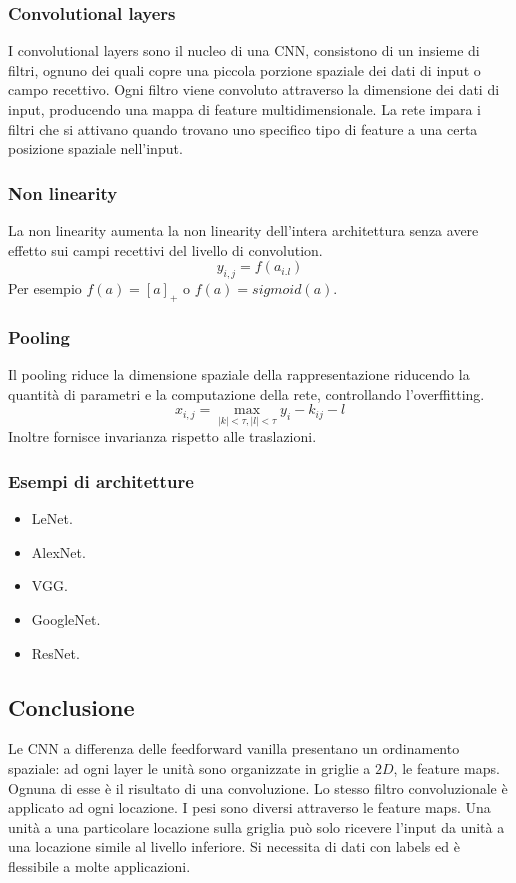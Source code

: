 		\subsubsection{Convolutional layers}
		I convolutional layers sono il nucleo di una CNN, consistono di un insieme di filtri, ognuno dei quali copre una piccola porzione spaziale dei dati di input o campo recettivo.
		Ogni filtro viene convoluto attraverso la dimensione dei dati di input, producendo una mappa di feature multidimensionale.
		La rete impara i filtri che si attivano quando trovano uno specifico tipo di feature a una certa posizione spaziale nell'input.

		\subsubsection{Non linearity}
		La non linearity aumenta la non linearity dell'intera architettura senza avere effetto sui campi recettivi del livello di convolution.
		$$y_{i,j} = f(a_{i.l})$$
		Per esempio $f(a) = [a]_+$ o $f(a) = sigmoid(a)$.

		\subsubsection{Pooling}
		Il pooling riduce la dimensione spaziale della rappresentazione riducendo la quantit\`a di parametri e la computazione della rete, controllando l'overffitting.
		$$x_{i,j} = \max\limits_{|k|<\tau, |l|<\tau}y_i - k_{ij} - l$$
		Inoltre fornisce invarianza rispetto alle traslazioni.

		\subsubsection{Esempi di architetture}
		\begin{multicols}{2}
			\begin{itemize}
				\item LeNet.
				\item AlexNet.
				\item VGG.
				\item GoogleNet.
				\item ResNet.
			\end{itemize}
		\end{multicols}

	\subsection{Conclusione}
	Le CNN a differenza delle feedforward vanilla presentano un ordinamento spaziale: ad ogni layer le unit\`a sono organizzate in griglie a $2D$, le feature maps.
	Ognuna di esse \`e il risultato di una convoluzione.
	Lo stesso filtro convoluzionale \`e applicato ad ogni locazione.
	I pesi sono diversi attraverso le feature maps.
	Una unit\`a a una particolare locazione sulla griglia pu\`o solo ricevere l'input da unit\`a a una locazione simile al livello inferiore.
	Si necessita di dati con labels ed \`e flessibile a molte applicazioni.

